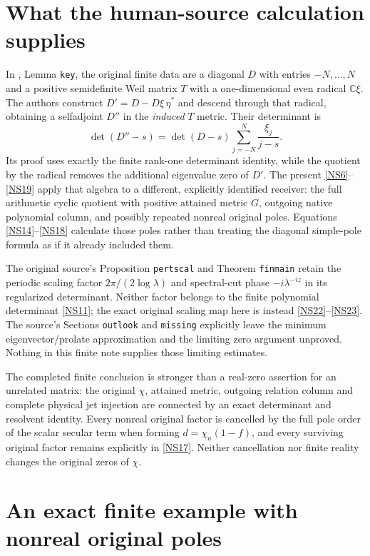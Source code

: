 \documentclass[11pt]{article}
\newcommand{\C}{\mathbb C}\newcommand{\R}{\mathbb R}
\begin{document}
\section{What the human-source calculation supplies}

In \cite{CCM}, Lemma \texttt{key}, the original finite
data are a diagonal $D$ with entries $-N,\ldots,N$ and
a positive semidefinite Weil matrix $T$ with a
one-dimensional even radical $\C\xi$.
The authors construct $D'=D-D\xi\,\eta^*$ and descend
through that radical, obtaining a selfadjoint $D''$ in
the \emph{induced} $T$ metric. Their determinant is
\[
\det(D''-s)=\det(D-s)\sum_{j=-N}^N\frac{\xi_j}{j-s}.
\]
Its proof uses exactly the finite rank-one determinant
identity, while the quotient by the radical removes
the additional eigenvalue zero of $D'$.
The present \eqref{NS6}--\eqref{NS19} apply that algebra
to a different, explicitly identified receiver: the
full arithmetic cyclic quotient with positive attained
metric $G$, outgoing native polynomial column, and
possibly repeated nonreal original poles.
Equations \eqref{NS14}--\eqref{NS18} calculate those
poles rather than treating the diagonal simple-pole
formula as if it already included them.

The original source's Proposition \texttt{pertscal}
and Theorem \texttt{finmain} retain the periodic
scaling factor $2\pi/(2\log\lambda)$ and spectral-cut
phase $-i\lambda^{-iz}$ in its regularized determinant.
Neither factor belongs to the finite polynomial
determinant \eqref{NS11}; the exact original scaling
map here is instead \eqref{NS22}--\eqref{NS23}.
The source's Sections \texttt{outlook} and
\texttt{missing} explicitly leave the minimum
eigenvector/prolate approximation and the limiting
zero argument unproved. Nothing in this finite note
supplies those limiting estimates.

The completed finite conclusion is stronger than a
real-zero assertion for an unrelated matrix: the
original $\chi$, attained metric, outgoing relation
column and complete physical jet injection are
connected by an exact determinant and resolvent
identity. Every nonreal original factor is cancelled
by the full pole order of the scalar secular term
when forming $d=\chi_u(1-f)$, and every
surviving original factor remains explicitly in
\eqref{NS17}. Neither cancellation nor finite reality
changes the original zeros of $\chi$.

\section{An exact finite example with nonreal original poles}
\end{document}
